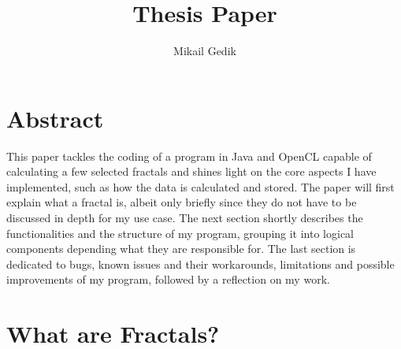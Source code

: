 \documentclass[10pt,a4paper,titlepage]{article}
\author{Mikail Gedik}
\title{Thesis Paper}
\begin{document}
	\maketitle
	\tableofcontents
	\listoffigures
	\clearpage
	\let\oldref\ref
	\renewcommand{\ref}[1]{\oldref{#1} (page \pageref{#1})}
	
	\section{Abstract}
	This paper tackles the coding of a program in Java and OpenCL capable of calculating a few selected fractals and shines light on the core aspects I have implemented, such as how the data is calculated and stored. The paper will first explain what a fractal is, albeit only briefly since they do not have to be discussed in depth for my use case. The next section shortly describes the functionalities and the structure of my program, grouping it into logical components depending what they are responsible for. The last section is dedicated to bugs, known issues and their workarounds, limitations and possible improvements of my program, followed by a reflection on my work.
	\section{What are Fractals?}
	
\end{document}
